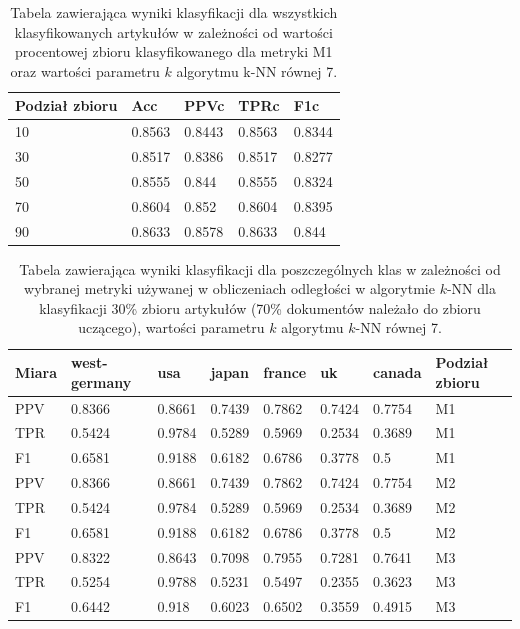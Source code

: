 \documentclass{classrep}
\begin{document}
\begin{table}[H]
    \centering
\caption{Tabela zawierająca wyniki klasyfikacji dla wszystkich klasyfikowanych artykułów w zależności od wartości procentowej zbioru
klasyfikowanego dla metryki M1 oraz wartości parametru $k$ algorytmu k-NN równej 7.}
\begin{adjustbox}{max width=\textwidth}
    \begin{tabular}{|l|l|l|l|l|}
    \hline
        Podział zbioru & Acc & PPVc & TPRc & F1c \\ \hline
        10 & 0.8563 & 0.8443 & 0.8563 & 0.8344 \\ \hline
        30 & 0.8517 & 0.8386 & 0.8517 & 0.8277 \\ \hline
        50 & 0.8555 & 0.844 & 0.8555 & 0.8324 \\ \hline
        70 & 0.8604 & 0.852 & 0.8604 & 0.8395 \\ \hline
        90 & 0.8633 & 0.8578 & 0.8633 & 0.844 \\ \hline
    \end{tabular}
\end{adjustbox}
\end{table}

\begin{table}[H]
    \centering
\caption{Tabela zawierająca wyniki klasyfikacji dla poszczególnych klas w zależności od wybranej metryki
używanej w obliczeniach odległości w algorytmie $k$-NN dla klasyfikacji 30\% zbioru
artykułów (70\% dokumentów należało do zbioru uczącego), wartości parametru $k$
algorytmu $k$-NN równej 7.}
\begin{adjustbox}{max width=\textwidth}
    \begin{tabular}{|l|l|l|l|l|l|l|l|}
    \hline
        Miara & west-germany  & usa  & japan & france & uk & canada & Podział zbioru \\ \hline
        PPV & 0.8366 & 0.8661 & 0.7439 & 0.7862 & 0.7424 & 0.7754 & M1 \\ \hline
        TPR & 0.5424 & 0.9784 & 0.5289 & 0.5969 & 0.2534 & 0.3689 & M1 \\ \hline
        F1 & 0.6581 & 0.9188 & 0.6182 & 0.6786 & 0.3778 & 0.5 & M1 \\ \hline
        PPV & 0.8366 & 0.8661 & 0.7439 & 0.7862 & 0.7424 & 0.7754 & M2 \\ \hline
        TPR & 0.5424 & 0.9784 & 0.5289 & 0.5969 & 0.2534 & 0.3689 & M2 \\ \hline
        F1 & 0.6581 & 0.9188 & 0.6182 & 0.6786 & 0.3778 & 0.5 & M2 \\ \hline
        PPV & 0.8322 & 0.8643 & 0.7098 & 0.7955 & 0.7281 & 0.7641 & M3 \\ \hline
        TPR & 0.5254 & 0.9788 & 0.5231 & 0.5497 & 0.2355 & 0.3623 & M3 \\ \hline
        F1 & 0.6442 & 0.918 & 0.6023 & 0.6502 & 0.3559 & 0.4915 & M3 \\ \hline
    \end{tabular}
\end{adjustbox}
\end{table}
\end{document}
